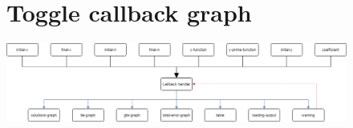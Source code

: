 \documentclass[12pt,letterpaper]{article}
\begin{document}
\begin{figure}[!h]
    \begin{center}
        \section*{Toggle callback graph}
    \end{center}
    \centering
        \includegraphics[width=1\linewidth]{callback.png}
\end{figure}
\end{document}
